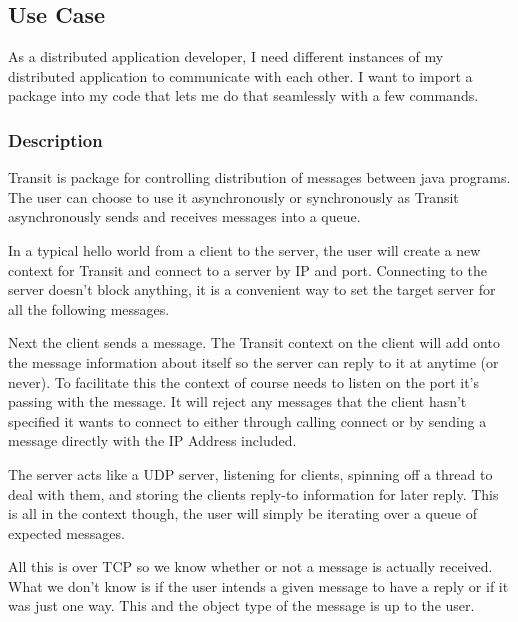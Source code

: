 \documentclass[11pt,journal,compsoc]{IEEEtran}
\begin{document}

 

\lstset{basicstyle=\small}

\subsection{Use Case}
As a distributed application developer, I need different instances of my distributed application to communicate with each other. I want to import a package into my code that lets me do that seamlessly with a few commands.


\subsubsection{Description}
Transit is package for controlling distribution of messages between java programs. The user can choose to use it asynchronously or synchronously as Transit asynchronously sends and receives messages into a queue.

In a typical hello world from a client to the server, the user will create a new context for Transit and connect to a server by IP and port. Connecting to the server doesn't block anything, it is a convenient way to set the target server for all the following messages. 
 
Next the client sends a message. The Transit context on the client will add onto the message information about itself so the server can reply to it at anytime (or never). To facilitate this the context of course needs to listen on the port it's passing with the message. It will reject any messages that the client hasn't specified it wants to connect to either through calling connect or by sending a message directly with the IP Address included.

The server acts like a UDP server, listening for clients, spinning off a thread to deal with them, and storing the clients reply-to information for later reply. This is all in the context though, the user will simply be iterating over a queue of expected messages.

All this is over TCP so we know whether or not a message is actually received. What we don't know is if the user intends a given message to have a reply or if it was just one way. This and the object type of the message is up to the user.
\end{document}
